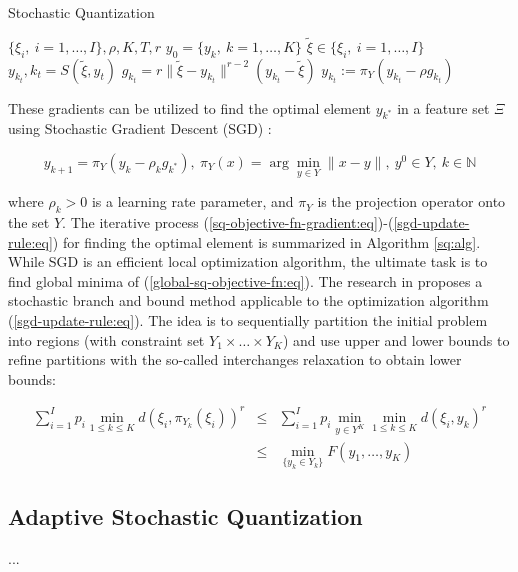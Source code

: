 \begin{algorithm}
    \caption{Stochastic Quantization}\label{sq:alg}
    \begin{algorithmic}[1]
    \Require $ \{ \xi_i, \> i = 1, \ldots, I \}, \rho, K, T, r $
    \State $ y_0 = \{ y_k, \> k = 1, \ldots, K \} $ 
        \State $ \tilde{\xi} \in \{ \xi_i, \> i = 1, \ldots, I \} $ 
        \State $ y_{k_t}, k_t = S(\tilde{\xi}, y_t) $ 
        \State $ g_{k_t} = r \| \tilde{\xi} - y_{k_t} \|^{r - 2} (y_{k_t} - \tilde{\xi}) $ 
        \State $ y_{k_t} := \pi_Y (y_{k_t} - \rho g_{k_t}) $ 
    \EndFor
    \end{algorithmic}
\end{algorithm}

These gradients can be utilized to find the optimal element $y_{k^*}$ in a feature set $\Xi$ using Stochastic Gradient Descent (SGD) \cite{ermoliev1976stochastic,kiefer1952stochastic,Norkin_Kozyriev_Norkin_2024,Robbins_Monro_1951}:

\begin{equation}
    \label{sgd-update-rule:eq}
        y_{k+1} = \pi_Y (y_k - \rho_k g_{k^*}), \> \pi_Y (x) = \arg \min_{y \in Y} \| x - y\|, \> y^0 \in Y, \> k \in \mathbb{N}
\end{equation}

\noindent where $\rho_k > 0$ is a learning rate parameter, and $\pi_Y$ is the projection operator onto the set $Y$. The iterative process (\ref{sq-objective-fn-gradient:eq})-(\ref{sgd-update-rule:eq}) for finding the optimal element is summarized in Algorithm \ref{sq:alg}. While SGD is an efficient local optimization algorithm, the ultimate task is to find global minima of (\ref{global-sq-objective-fn:eq}). The research in \cite{Norkin_Pflug_Ruszczynski_1998} proposes a stochastic branch and bound method applicable to the optimization algorithm (\ref{sgd-update-rule:eq}). The idea is to sequentially partition the initial problem into regions (with constraint set $Y_1 \times \ldots \times Y_K$) and use upper and lower bounds to refine partitions with the so-called interchanges relaxation to obtain lower bounds:

\begin{eqnarray}
    \label{sq-branch-bound:eq}
        \sum_{i=1}^I p_i \min_{1 \leq k \leq K} d(\xi_i, \pi_{Y_k} (\xi_i))^r
        &\leq& \sum_{i=1}^I p_i \min_{y \in Y^K} \min_{1 \leq k \leq K} d(\xi_i, y_k)^r \nonumber \\
        &\leq& \min_{\{ y_k \in Y_k \}} F(y_1, \ldots, y_K)
\end{eqnarray}

\subsection{Adaptive Stochastic Quantization}

...
